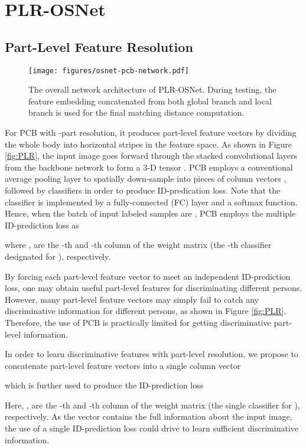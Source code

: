 \documentclass[journal]{IEEEtran}
\begin{document}
\section{PLR-OSNet}
\label{headings}
\subsection{Part-Level Feature Resolution}
\begin{figure*}
\begin{center}
\texttt{[image: figures/osnet-pcb-network.pdf]} \end{center}
   \caption{The overall network architecture of PLR-OSNet. During testing, the feature embedding concatenated from both global branch and local branch is used for the final matching distance computation.}
\label{fig:net}
\end{figure*}
For PCB with -part resolution, it produces  part-level feature vectors by dividing the whole body into  horizontal stripes in the feature space. As shown in Figure \ref{fig:PLR}, the input image goes forward through the stacked convolutional layers from the backbone network to form a 3-D tensor . PCB employs a conventional average pooling layer to spatially down-sample  into  pieces of column vectors , followed by  classifiers in order to produce  ID-predication loss. Note that the classifier is implemented by a fully-connected (FC) layer and a softmax function. Hence, when the batch of input labeled samples are , PCB employs the multiple ID-prediction loss as

where ,  are the -th and -th column of the weight matrix  (the -th classifier designated for ), respectively.

By forcing each part-level feature vector to meet an independent ID-prediction loss, one may obtain useful part-level features for discriminating different persons. However, many part-level feature vectors may simply fail to catch any discriminative information for different persons, as shown in Figure \ref{fig:PLR}. Therefore, the use of PCB is practically limited for getting discriminative part-level information.

In order to learn discriminative features with part-level resolution, we propose to concatenate  part-level feature vectors into a single column vector

which is further used to produce the ID-prediction loss

Here, ,  are the -th and -th column of the weight matrix  (the single  classifier for ), respectively. As the vector  contains the full information about the input image, the use of a single ID-prediction loss could drive  to learn sufficient discriminative information.
\end{document}
